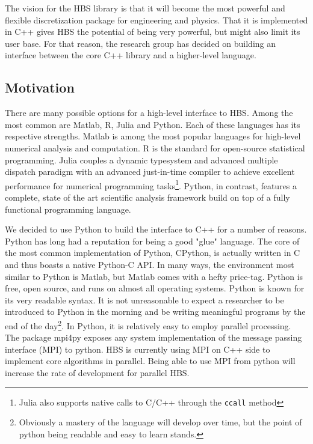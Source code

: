     The vision for the HBS library is that it will become the most powerful and flexible discretization package for engineering and physics. That it is implemented in C++ gives HBS the potential of being very powerful, but might also limit its user base. For that reason, the research group has decided on building an interface between the core C++ library and a higher-level language.

  \subsection{Motivation} \label{ssec:motivation}

    There are many possible options for a high-level interface to HBS. Among the most common are Matlab, R, Julia and Python. Each of these languages has its respective strengths. Matlab is among the most popular languages for high-level numerical analysis and computation. R is the standard for open-source statistical programming. Julia couples a dynamic typesystem and advanced multiple dispatch paradigm with an advanced just-in-time compiler to achieve excellent performance for numerical programming tasks\footnote{Julia also supports native calls to C/C++ through the \texttt{ccall} method}. Python, in contrast, features a complete, state of the art scientific analysis framework build on top of a fully functional programming language.

    We decided to use Python to build the interface to C++ for a number of reasons. Python has long had a reputation for being a good "glue" language. The core of the most common implementation of Python, CPython, is actually written in C and thus boasts a native Python-C API. In many ways, the environment most similar to Python is Matlab, but Matlab comes with a hefty price-tag. Python is free, open source, and runs on almost all operating systems. Python is known for its very readable syntax. It is not unreasonable to expect a researcher to be introduced to Python in the morning and be writing meaningful programs by the end of the day\footnote{Obviously a mastery of the language will develop over time, but the point of python being readable and easy to learn stands.}. In Python, it is relatively easy to employ parallel processing. The package mpi4py exposes any system implementation of the message passing interface (MPI) to python. HBS is currently using MPI on C++ side to implement core algorithms in parallel. Being able to use MPI from python will increase the rate of development for parallel HBS.

